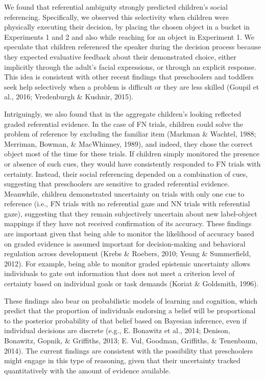 \documentclass[english,man]{apa6}
\theoremstyle{definition}
\theoremstyle{definition}
\theoremstyle{definition}
\theoremstyle{remark}
\begin{document}
We found that referential ambiguity strongly predicted children's social
referencing. Specifically, we observed this selectivity when children
were physically executing their decision, by placing the chosen object
in a bucket in Experiments 1 and 2 and also while reaching for an object
in Experiment 1. We speculate that children referenced the speaker
during the decision process because they expected evaluative feedback
about their demonstrated choice, either implicitly through the adult's
facial expressions, or through an explicit response. This idea is
consistent with other recent findings that preschoolers and toddlers
seek help selectively when a problem is difficult or they are less
skilled (Goupil et al., 2016; Vredenburgh \& Kushnir, 2015).

Intriguingly, we also found that in the aggregate children's looking
reflected graded referential evidence. In the case of FN trials,
children could solve the problem of reference by excluding the familiar
item (Markman \& Wachtel, 1988; Merriman, Bowman, \& MacWhinney, 1989),
and indeed, they chose the correct object most of the time for these
trials. If children simply monitored the presence or absence of such
cues, they would have consistently responded to FN trials with
certainty. Instead, their social referencing depended on a combination
of cues, suggesting that preschoolers are sensitive to graded
referential evidence. Meanwhile, children demonstrated uncertainty on
trials with only one cue to reference (i.e., FN trials with no
referential gaze and NN trials with referential gaze), suggesting that
they remain subjectively uncertain about new label-object mappings if
they have not received confirmation of its accuracy. These findings are
important given that being able to monitor the likelihood of accuracy
based on graded evidence is assumed important for decision-making and
behavioral regulation across development (Krebs \& Roebers, 2010; Yeung
\& Summerfield, 2012). For example, being able to monitor graded
epistemic uncertainty allows individuals to gate out information that
does not meet a criterion level of certainty based on individual goals
or task demands (Koriat \& Goldsmith, 1996).

These findings also bear on probabilistic models of learning and
cognition, which predict that the proportion of individuals endorsing a
belief will be proportional to the posterior probability of that belief
based on Bayesian inference, even if individual decisions are discrete
(e.g., E. Bonawitz et al., 2014; Denison, Bonawitz, Gopnik, \&
Griffiths, 2013; E. Vul, Goodman, Griffiths, \& Tenenbaum, 2014). The
current findings are consistent with the possibility that preschoolers
might engage in this type of reasoning, given that their uncertainty
tracked quantitatively with the amount of evidence available.
\end{document}
